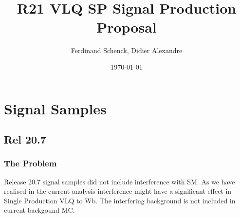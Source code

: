 \documentclass{beamer}
\title[HQT Meeting]{R21 VLQ SP Signal Production Proposal} %
\author{Ferdinand Schenck, Didier Alexandre} %
\institute[HU-Berlin] %
{
\medskip
\textit{ferdinand.schenck@cern.ch} %
}
\date{\today} %
\begin{document}
\begin{frame}
\titlepage %
\end{frame}



\section{Signal Samples} %


\subsection{Rel 20.7} %



\begin{frame}
\frametitle{The Problem}
Release 20.7 signal samples did not include interference with SM. 
\linebreak
\linebreak
As we have realised in the current analysis interference might have a significant effect in Single Production VLQ to Wb. 
\linebreak
\linebreak
The interfering background is not included in current backgound MC.




\end{frame}
\end{document}
